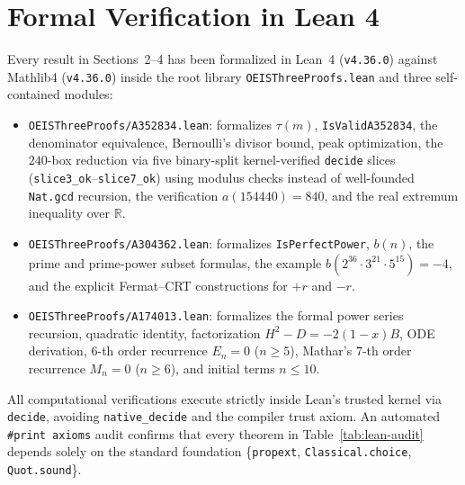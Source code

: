 \documentclass[11pt,a4paper]{article}
\theoremstyle{definition}
\theoremstyle{remark}
\newcommand{\R}{\mathbb{R}}
\begin{document}
\section{Formal Verification in Lean 4}

Every result in Sections~2--4 has been formalized in Lean~4 (\texttt{v4.36.0}) against Mathlib4 (\texttt{v4.36.0}) inside the root library \texttt{OEISThreeProofs.lean} and three self-contained modules:
\begin{itemize}
  \item \texttt{OEISThreeProofs/A352834.lean}: formalizes $\tau(m)$, \texttt{IsValidA352834}, the denominator equivalence, Bernoulli's divisor bound, peak optimization, the $240$-box reduction via five binary-split kernel-verified \texttt{decide} slices (\texttt{slice3\_ok}--\texttt{slice7\_ok}) using modulus checks instead of well-founded \texttt{Nat.gcd} recursion, the verification $a(154440) = 840$, and the real extremum inequality over $\R$.
  \item \texttt{OEISThreeProofs/A304362.lean}: formalizes \texttt{IsPerfectPower}, $b(n)$, the prime and prime-power subset formulas, the example $b(2^{36}\cdot 3^{21}\cdot 5^{15}) = -4$, and the explicit Fermat--CRT constructions for $+r$ and $-r$.
  \item \texttt{OEISThreeProofs/A174013.lean}: formalizes the formal power series recursion, quadratic identity, factorization $H^2 - D = -2(1-x)B$, ODE derivation, $6$-th order recurrence $E_n=0$ ($n \ge 5$), Mathar's $7$-th order recurrence $M_n = 0$ ($n \ge 6$), and initial terms $n \le 10$.
\end{itemize}

All computational verifications execute strictly inside Lean's trusted kernel via \texttt{decide}, avoiding \texttt{native\_decide} and the compiler trust axiom. An automated \texttt{\#print axioms} audit confirms that every theorem in Table~\ref{tab:lean-audit} depends solely on the standard foundation \{\texttt{propext}, \texttt{Classical.choice}, \texttt{Quot.sound}\}.
\end{document}
